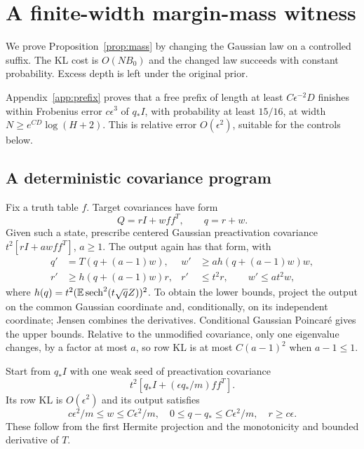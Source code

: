 \documentclass[11pt]{article}
\begin{document}
\section{A finite-width margin-mass witness}\label{sec:mass}
We prove Proposition~\ref{prop:mass} by changing the Gaussian law on a controlled suffix. The KL cost is $O(NB_0)$ and the changed law succeeds with constant probability. Excess depth is left under the original prior.

Appendix~\ref{app:prefix} proves that a free prefix of length at least $C\epsilon^{-2}D$ finishes within Frobenius error $c\epsilon^3$ of $q_*I$, with probability at least $15/16$, at width $N\ge e^{CD}\log(H+2)$. This is relative error $O(\epsilon^2)$, suitable for the controls below.

\subsection{A deterministic covariance program}
Fix a truth table $f$. Target covariances have form
\begin{equation}
 Q=rI+wff^T,\qquad q=r+w.
\end{equation}
Given such a state, prescribe centered Gaussian preactivation covariance $t^2[rI+awff^T]$, $a\ge1$. The output again has that form, with
\begin{align}
 q'&=T(q+(a-1)w),&w'&\ge ah(q+(a-1)w)w,\label{eq:program}\\
 r'&\ge h(q+(a-1)w)r,&r'&\le t^2r,\qquad w'\le at^2w,\nonumber
\end{align}
where $h(q)=t^2(\mathbb E\operatorname{sech}^2(t\sqrt q Z))^2$. To obtain the lower bounds, project the output on the common Gaussian coordinate and, conditionally, on its independent coordinate; Jensen combines the derivatives. Conditional Gaussian Poincar\'e gives the upper bounds. Relative to the unmodified covariance, only one eigenvalue changes, by a factor at most $a$, so row KL is at most $C(a-1)^2$ when $a-1\le1$.

Start from $q_*I$ with one weak seed of preactivation covariance
\begin{equation}
 t^2[q_*I+(\epsilon q_*/m)ff^T].
\end{equation}
Its row KL is $O(\epsilon^2)$ and its output satisfies
\begin{equation}\label{eq:seed}
 c\epsilon^2/m\le w\le C\epsilon^2/m,\quad
 0\le q-q_*\le C\epsilon^2/m,\quad r\ge c\epsilon.
\end{equation}
These follow from the first Hermite projection and the monotonicity and bounded derivative of $T$.
\end{document}
